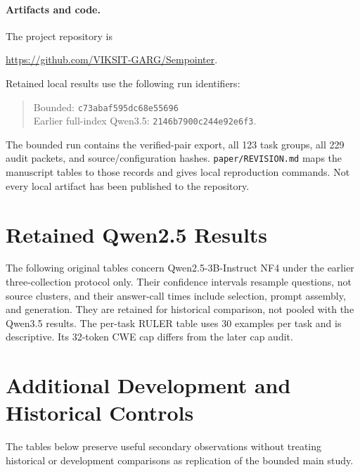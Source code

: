 \documentclass[runningheads]{llncs}
\begin{document}
\paragraph{Artifacts and code.}
The project repository is
\begin{center}\url{https://github.com/VIKSIT-GARG/Sempointer}.\end{center}
Retained local results use the following run identifiers:
\begin{quote}\small
Bounded: \texttt{c73abaf595dc68e55696}\\
Earlier full-index Qwen3.5: \texttt{2146b7900c244e92e6f3}.
\end{quote}
The bounded run contains the verified-pair export, all 123 task groups, all 229 audit packets, and source/configuration hashes. \texttt{paper/REVISION.md} maps the manuscript tables to those records and gives local reproduction commands. Not every local artifact has been published to the repository.

\clearpage
\appendix
\section{Retained Qwen2.5 Results}\label{sec:historical}
The following original tables concern Qwen2.5-3B-Instruct NF4 under the earlier three-collection protocol only. Their confidence intervals resample questions, not source clusters, and their answer-call times include selection, prompt assembly, and generation. They are retained for historical comparison, not pooled with the Qwen3.5 results. The per-task RULER table uses 30 examples per task and is descriptive. Its 32-token CWE cap differs from the later cap audit.
\begingroup
\setlength{\intextsep}{6pt}
\let\historicaltable\table
\renewcommand{\table}[1][]{\historicaltable[H]}




\endgroup
\clearpage
\section{Additional Development and Historical Controls}\label{sec:additional-history}
The tables below preserve useful secondary observations without treating historical or development comparisons as replication of the bounded main study.


\clearpage
\end{document}
